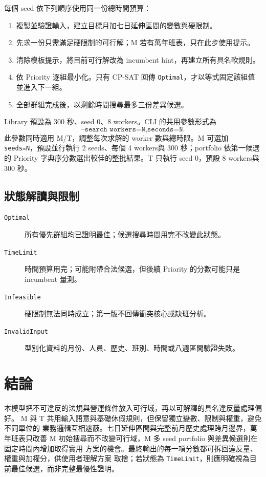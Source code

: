 \documentclass[a4paper,12pt]{article}
\begin{document}
每個 seed 依下列順序使用同一份總時間預算：
\begin{enumerate}
  \item 複製並驗證輸入，建立目標月加七日延伸區間的變數與硬限制。
  \item 先求一份只需滿足硬限制的可行解；M 若有萬年班表，只在此步使用提示。
  \item 清除模板提示，將目前可行解改為 incumbent hint，再建立所有具名軟規則。
  \item 依 Priority 逐組最小化。只有 CP-SAT 回傳 \texttt{Optimal}，才以等式固定該組值並進入下一組。
  \item 全部群組完成後，以剩餘時間搜尋最多三份差異候選。
\end{enumerate}

Library 預設為 300 秒、seed 0、8 workers。CLI 的共用參數形式為
\[
  \texttt{--search workers=N,seconds=N}.
\]
此參數同時適用 M/T，調整每次求解的 worker 數與總時限。M 可選加
\texttt{seeds=N}，預設並行執行 2 seeds、每個 4 workers與 300 秒；portfolio 依第一候選的
Priority 字典序分數選出較佳的整批結果。T 只執行 seed 0，預設 8 workers與 300 秒。

\subsection{狀態解讀與限制}

\begin{description}
  \item[\texttt{Optimal}] 所有優先群組均已證明最佳；候選搜尋時間用完不改變此狀態。
  \item[\texttt{TimeLimit}] 時間預算用完；可能附帶合法候選，但後續 Priority 的分數可能只是 incumbent 量測。
  \item[\texttt{Infeasible}] 硬限制無法同時成立；第一版不回傳衝突核心或缺班分析。
  \item[\texttt{InvalidInput}] 型別化資料的月份、人員、歷史、班別、時間或八週區間驗證失敗。
\end{description}

\section{結論}

本模型把不可違反的法規與營運條件放入可行域，再以可解釋的具名違反量處理偏好。
M 與 T 共用輸入語意與基礎休假規則，但保留獨立變數、限制與權重，避免不同單位的
業務邏輯互相遮蔽。七日延伸區間與完整前月歷史處理跨月邊界，萬年班表只改善 M
初始搜尋而不改變可行域，M 多 seed portfolio 與差異候選則在固定時間內增加取得實用
方案的機會。最終輸出的每一項分數都可拆回違反量、權重與加權分，供使用者理解方案
取捨；若狀態為 \texttt{TimeLimit}，則應明確視為目前最佳候選，而非完整最優性證明。
\end{document}
